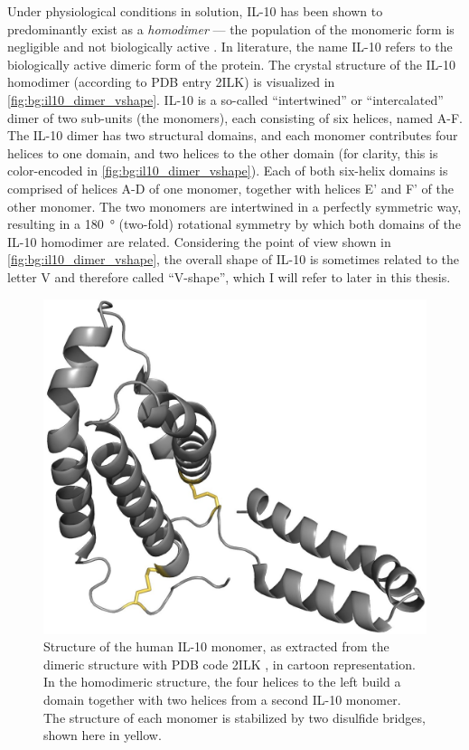 Under physiological conditions in solution, IL-10 has been shown to
predominantly exist as a \textit{homodimer} --- the population of the monomeric
form is negligible and not biologically active \cite{syto_il10_homodimer_1998}.
In literature, the name IL-10 refers to the biologically active dimeric form of
the protein. The crystal structure of the IL-10 homodimer (according to PDB
entry 2ILK) is visualized in \cref{fig:bg:il10_dimer_vshape}. IL-10 is a
so-called \enquote{intertwined} or \enquote{intercalated} dimer of two sub-units
(the monomers), each consisting of six helices, named A-F. The IL-10 dimer has
two structural domains, and each monomer contributes four helices to one domain,
and two helices to the other domain (for clarity, this is color-encoded in
\cref{fig:bg:il10_dimer_vshape}). Each of both six-helix domains is comprised of
helices A-D of one monomer, together with helices E' and F' of the other
monomer. The two monomers are intertwined in a perfectly symmetric way,
resulting in a \SI{180}{\degree} (two-fold) rotational symmetry by which both
domains of the IL-10 homodimer are related. Considering the point of view shown
in \cref{fig:bg:il10_dimer_vshape}, the overall shape of IL-10 is sometimes
related to the letter V and therefore called \enquote{V-shape}, which I will
refer to later in this thesis.

\begin{figure}
\centering
\includegraphics[width=1.0\textwidth]{gfx/background/IL10_2ilk_disulfide_with.jpg}
\caption[]{
Structure of the human IL-10 monomer, as extracted from the dimeric structure
with PDB code 2ILK \cite{Zdanov1996}, in cartoon representation. In the
homodimeric structure, the four helices to the left build a domain together with
two helices from a second IL-10 monomer. The structure of each monomer is
stabilized by two disulfide bridges, shown here in yellow. }
\label{fig:bg:il10_monomer_disulfide}
\end{figure}

